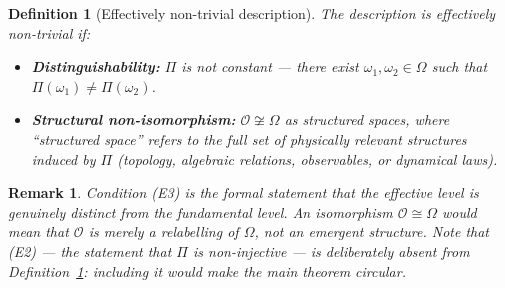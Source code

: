 \documentclass[12pt,a4paper]{article}
\newtheorem{definition}{Definition}
\newtheorem{remark}{Remark}
\begin{document}
  \begin{definition}[Effectively non-trivial description]
    \label{def:non-trivial}
    The description is \emph{effectively non-trivial} if:
    \begin{itemize}
      \item[(E1)] \textbf{Distinguishability:} $\Pi$ is not constant ---
      there exist $\omega_1, \omega_2 \in \Omega$ such that
      $\Pi(\omega_1) \neq \Pi(\omega_2)$.
      \item[(E3)] \textbf{Structural non-isomorphism:} $\mathcal{O} \not\cong \Omega$
      as structured spaces, where ``structured space'' refers to the full set of
      physically relevant structures induced by $\Pi$ (topology, algebraic
      relations, observables, or dynamical laws).
    \end{itemize}
  \end{definition}

  \begin{remark}
    Condition (E3) is the formal statement that the effective level is
    genuinely distinct from the fundamental level.
    An isomorphism $\mathcal{O} \cong \Omega$ would mean that $\mathcal{O}$ is
    merely a relabelling of $\Omega$, not an emergent structure.
    Note that (E2) --- the statement that $\Pi$ is non-injective --- is
    deliberately absent from Definition~\ref{def:non-trivial}: including it
    would make the main theorem circular.
  \end{remark}
\end{document}
